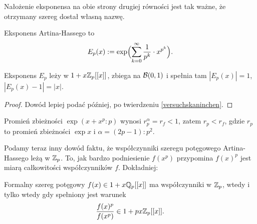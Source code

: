 Nałożenie eksponensa na obie strony drugiej równości jest tak ważne, że otrzymany szereg dostał własną nazwę.

\begin{definicja}
	Eksponens Artina-Hassego to
	\[
		E_p(x) := \exp \Bigl( \sum_{k=0}^\infty \frac{1}{p^k} \cdot x^{p^k}\Bigr).
	\]
\end{definicja}

\begin{fakt}
	Eksponens  $E_p$ leży w $1+ x\mathbb Z_p[[x]]$, zbiega na $\mathcal B(0, 1)$ i spełnia tam $|E_p(x)| = 1$, $|E_p(x) - 1| = |x|$.
\end{fakt}

\begin{proof}
	Dowód lepiej podać później, po twierdzeniu \ref{versuchskaninchen}.
\end{proof}

\begin{fakt}
	Promień zbieżności $\exp(x + x^p : p)$ wynosi $r_p^\alpha = r_f < 1$, zatem $r_p < r_f$, gdzie $r_p$ to promień zbieżności $\exp x$ i $\alpha = (2p-1):p^2$.
\end{fakt}

Podamy teraz inny dowód faktu, że współczynniki szeregu potęgowego Artina-Hassego leżą w $\mathbb Z_p$.
To, jak bardzo podniesienie $f(x^p)$ przypomina $f(x)^p$ jest miarą całkowitości współczynników $f$.
Dokładniej:

\begin{twierdzenie} 
	\label{versuchskaninchen}
	Formalny  szereg potęgowy $f(x) \in 1+x \mathbb Q_p[[x]]$ ma współczynniki w $\mathbb Z_p$, wtedy i tylko wtedy gdy spełniony jest warunek
	\[
		\frac{f(x)^p}{f(x^p)} \in 1 + px \mathbb Z_p[[x]].
	\]
\end{twierdzenie}


